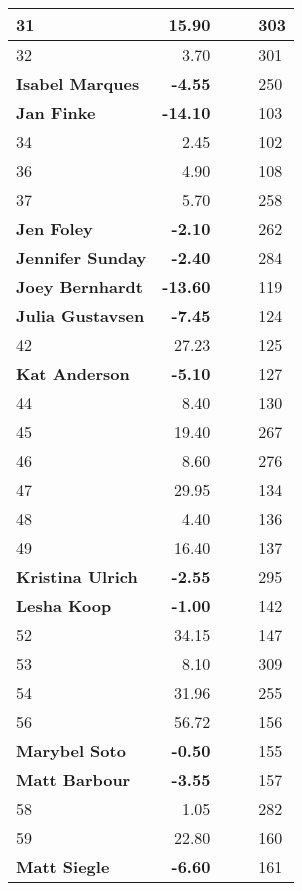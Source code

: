 \begin{longtable}{|p{5cm}|r|p{9cm}|p{6cm}|l|}
   \hline
31 & 15.90 &  &  & 303 \\ 
   \hline
32 & 3.70 &  &  & 301 \\ 
   \hline
\textbf{Isabel Marques} & \textbf{-4.55} &  &  & 250 \\ 
   \hline
\textbf{Jan Finke} & \textbf{-14.10} &  &  & 103 \\ 
   \hline
34 & 2.45 &  &  & 102 \\ 
   \hline
36 & 4.90 &  &  & 108 \\ 
   \hline
37 & 5.70 &  &  & 258 \\ 
   \hline
\textbf{Jen Foley} & \textbf{-2.10} &  &  & 262 \\ 
   \hline
\textbf{Jennifer Sunday} & \textbf{-2.40} &  &  & 284 \\ 
   \hline
\textbf{Joey Bernhardt} & \textbf{-13.60} &  &  & 119 \\ 
   \hline
\textbf{Julia Gustavsen} & \textbf{-7.45} &  &  & 124 \\ 
   \hline
42 & 27.23 &  &  & 125 \\ 
   \hline
\textbf{Kat Anderson} & \textbf{-5.10} &  &  & 127 \\ 
   \hline
44 & 8.40 &  &  & 130 \\ 
   \hline
45 & 19.40 &  &  & 267 \\ 
   \hline
46 & 8.60 &  &  & 276 \\ 
   \hline
47 & 29.95 &  &  & 134 \\ 
   \hline
48 & 4.40 &  &  & 136 \\ 
   \hline
49 & 16.40 &  &  & 137 \\ 
   \hline
\textbf{Kristina Ulrich} & \textbf{-2.55} &  &  & 295 \\ 
   \hline
\textbf{Lesha Koop} & \textbf{-1.00} &  &  & 142 \\ 
   \hline
52 & 34.15 &  &  & 147 \\ 
   \hline
53 & 8.10 &  &  & 309 \\ 
   \hline
54 & 31.96 &  &  & 255 \\ 
   \hline
56 & 56.72 &  &  & 156 \\ 
   \hline
\textbf{Marybel Soto} & \textbf{-0.50} &  &  & 155 \\ 
   \hline
\textbf{Matt Barbour} & \textbf{-3.55} &  &  & 157 \\ 
   \hline
58 & 1.05 &  &  & 282 \\ 
   \hline
59 & 22.80 &  &  & 160 \\ 
   \hline
\textbf{Matt Siegle} & \textbf{-6.60} &  &  & 161 \\ 

\end{longtable}
